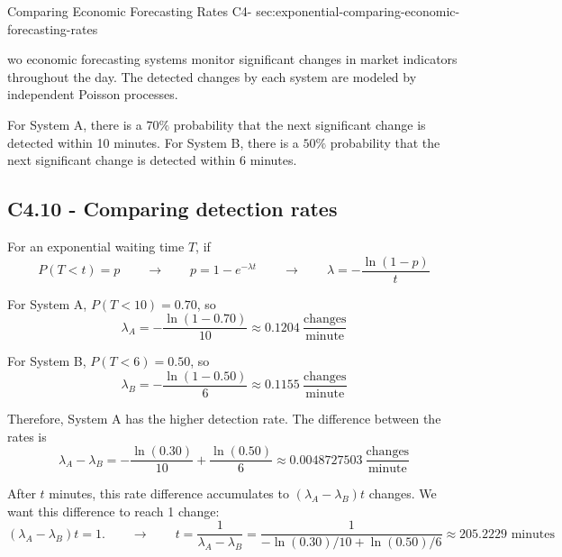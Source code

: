 	\sectionScored
	{Comparing Economic Forecasting Rates}
	{C4-}
	{sec:exponential-comparing-economic-forecasting-rates}
	{
		wo economic forecasting systems monitor significant changes in market
		indicators throughout the day. The detected changes by each system are
		modeled by independent Poisson processes.
		
		For System A, there is a \(70\%\) probability that the next significant
		change is detected within 10 minutes. For System B, there is a \(50\%\)
		probability that the next significant change is detected within
		6 minutes.
		
		
		\label{subsec:c4-compare-rates-economic}
		\subsection*{C4.10 - Comparing detection rates}
		
		For an exponential waiting time \(T\), if
		$$
		P(T<t)=p
		\qquad \longrightarrow \qquad
		p=1-e^{-\lambda t}
		\qquad \longrightarrow \qquad
		{
			\lambda=-\frac{\ln(1-p)}{t}
		}
		$$
		
		For System A, \(P(T<10)=0.70\), so
		$$
		\lambda_A
		=-\frac{\ln(1-0.70)}{10}
		\approx0.1204
		\>\frac{\text{changes}}{\text{minute}}
		$$
		
		For System B, \(P(T<6)=0.50\), so
		$$
		\lambda_B
		=-\frac{\ln(1-0.50)}{6}
		\approx0.1155
		\>\frac{\text{changes}}{\text{minute}}
		$$
		
		Therefore, System A has the higher detection rate. The difference
		between the rates is
		$$
		\lambda_A-\lambda_B
		=-\frac{\ln(0.30)}{10}+\frac{\ln(0.50)}6
		\approx0.0048727503
		\>\frac{\text{changes}}{\text{minute}}
		$$
		
		After \(t\) minutes, this rate difference accumulates to
		$
		(\lambda_A-\lambda_B)t
		$
		changes. We want this difference to reach 1 change:
		$$
		(\lambda_A-\lambda_B)t=1.
		\qquad \longrightarrow \qquad
		t
		=\frac{1}{\lambda_A-\lambda_B}
		=\frac{1}{-\ln(0.30)/10+\ln(0.50)/6}
		\approx \boxed{205.2229\text{ minutes}}
		$$
		\vspace{-5mm}
	}
	
